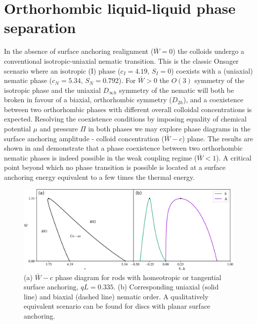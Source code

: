    \section{Orthorhombic liquid-liquid phase separation}

In the absence of surface anchoring realignment ($\bar{W} = 0$) the colloids undergo a conventional isotropic-uniaxial nematic transition. This is the classic Onsager scenario where an isotropic (I) phase  ($c_{I} = 4.19$, $S_{I} =0$) coexists with a (uniaxial) nematic phase  ($c_{N} = 5.34$, $S_{N} =0.792$). For $\bar{W} >0$ the $O(3)$ symmetry of the isotropic phase and the uniaxial $D_{\infty h}$ symmetry of the nematic will both be broken in favour of a biaxial, orthorhombic symmetry ($D_{2h}$), and a coexistence between two orthorhombic phases with different overall colloidal concentrations is expected. Resolving the coexistence conditions by imposing equality of chemical potential $\mu$ and pressure $\Pi$ in both phases we may explore phase diagrams in the surface anchoring amplitude - colloid concentration ($\bar{W} - c$) plane. The results are shown in  and demonstrate that a phase coexistence between two orthorhombic nematic phases is indeed possible in the weak coupling regime ($\bar{W} <1$). A critical point beyond which no phase transition is possible is located at a surface anchoring energy equivalent to a few times the thermal energy.

   \begin{figure}
	\includegraphics[width = \columnwidth]{figures/chapter-4/diagrams_q0.335_horizontal}
	\caption{(a) $\bar{W} - c $ phase diagram for rods with homeotropic or tangential surface anchoring, $qL = 0.335$. (b) Corresponding uniaxial (solid line) and biaxial (dashed line) nematic order. A qualitatively equivalent scenario can be found for discs with planar surface anchoring.}
	\label{phdiag}
\end{figure}


